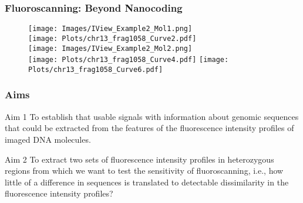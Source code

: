 \documentclass[10pt,dvipsnames,table]{beamer}
\begin{document}
\begin{frame}
\frametitle{Fluoroscanning: Beyond Nanocoding}
\begin{figure}[H]
\texttt{[image: Images/IView\_Example2\_Mol1.png]} \\
\texttt{[image: Plots/chr13\_frag1058\_Curve2.pdf]} \\

\texttt{[image: Images/IView\_Example2\_Mol2.png]} \\
\texttt{[image: Plots/chr13\_frag1058\_Curve4.pdf]} 
\texttt{[image: Plots/chr13\_frag1058\_Curve6.pdf]} 
\end{figure}

\end{frame}

\begin{frame}
\frametitle{Aims}
\begin{block}{Aim 1}
To establish that usable signals with information about genomic sequences that could be extracted from the features of the fluorescence intensity profiles of imaged DNA molecules.
\end{block}
\vspace{1cm}
\begin{block}{Aim 2}
To extract two sets of fluorescence intensity profiles in heterozygous regions from which we want to test the sensitivity of fluoroscanning, i.e., how little of a difference in sequences is translated to detectable dissimilarity in the fluorescence intensity profiles?
\end{block}
\end{frame}
\end{document}

